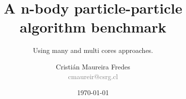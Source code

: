 \documentclass{beamer}
\author[C. Maureira]{\large Cristián Maureira Fredes\\\normalsize \textcolor{gray}{cmaureir@csrg.cl}}
\title[n-body benchmark]{A n-body particle-particle algorithm benchmark}
\subtitle{Using many and multi cores approaches.}
\institute[UTFSM]{Departamento de Informática\\Universidad Técnica Federico Santa María}
\date{\today}
\begin{document}
\begin{frame}[t,plain]
\titlepage
\end{frame}



\end{document}
